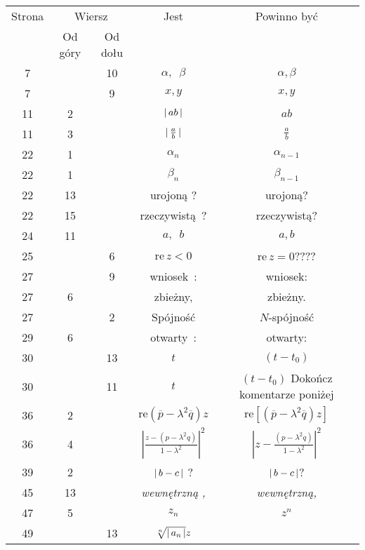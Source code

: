 \documentclass[a4paper,11pt]{article}
\newcommand{\re}{\textrm{re}}
\begin{document}
\begin{center}

  \begin{tabular}{|c|c|c|c|c|}
    \hline
    Strona & \multicolumn{2}{c|}{Wiersz} & Jest
                              & Powinno być \\ \cline{2-3}
    & Od góry & Od dołu & & \\
    \hline
    7   & & 10 & $\alpha,\:\; \beta$ & $\alpha, \beta$ \\
    7   & &  9 & $x,\! y$ & $x, y$ \\
    11  &  2 & & $|\, {  a b  } \,|$ & $ab$ \\
    11  &  3 & & $|\, {  \tfrac{ a }{ b }  } \,|$ & $\tfrac{ a }{ b }$ \\
    22  &  1 & & $\alpha_{ n }$ & $\alpha_{ n - 1 }$ \\
    22  &  1 & & $\beta_{ n }$ & $\beta_{ n - 1 }$ \\
    22  & 13 & & urojoną ? & urojoną? \\
    22  & 15 & & rzeczywistą~? & rzeczywistą? \\
    24  & 11 & & $a, \:\; b$ & $a, b$ \\
    25  & &  6 & $\textrm{re}\, z < 0$ & $\textrm{re}\, z = 0$???? \\
    27  & &  9 & wniosek~: & wniosek: \\
    27  &  6 & & zbieżny, & zbieżny. \\
    27  & &  2 & Spójność & $N$-spójność \\
    29  &  6 & & otwarty~: & otwarty: \\
    30  & & 13 & $t$ & $( t - t_{ 0 } )$ \\
    30  & & 11 & $t$ & $( t - t_{ 0 } )$ Dokończ komentarze poniżej \\
    36  &  2 & & $\re( \overline{ p } - \lambda^{ 2 } \overline{ q } ) z$
           & $\re[ ( \overline{ p } - \lambda^{ 2 } \overline{ q } ) z ]$ \\
    36  &  4 & & $\left| \frac{ z - ( p - \lambda^{ 2 } q) }
                 { 1 - \lambda^{ 2 } } \right|^{ 2 }$
           & $\left| z - \frac{ ( p - \lambda^{ 2 } q) }
             { 1 - \lambda^{ 2 } } \right|^{ 2 }$ \\
    39  &  2 & & $|\, {  b - c  } \,|$ ? & $|\, {  b - c  } \,|$? \\
    45  & 13 & & \textit{wewnętrzną ,} & \textit{wewnętrzną,} \\
    47  &  5 & & $z_{ n }$ & $z^{ n }$ \\
    49  & & 13 & $\sqrt[n]{ |\, {  a_{ n }  } \,| } z$

\end{tabular}
\end{center}
\end{document}
